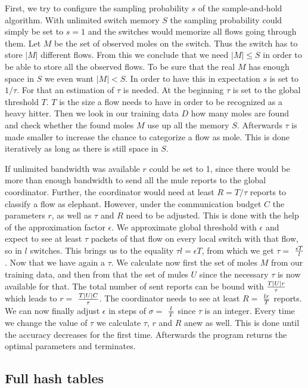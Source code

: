 \documentclass[11pt,oneside,a4paper]{article}
\begin{document}
First, we try to configure the sampling probability $s$ of the sample-and-hold algorithm. With unlimited switch memory $S$ the sampling probability could simply be set to $s=1$ and the switches would memorize all flows going through them. Let $M$ be the set of observed moles on the switch. Thus the switch has to store $|M|$ different flows. From this we conclude that we need $|M| \leq S$ in order to be able to store all the observed flows. To be sure that the real $M$ has enough space in $S$ we even want $|M| < S$. In order to have this in expectation $s$ is set to $1/\tau$. For that an estimation of $\tau$ is needed. At the beginning $\tau$ is set to the global threshold $T$. $T$ is the size a flow needs to have in order to be recognized as a heavy hitter. Then we look in our training data $D$ how many moles are found and check whether the found moles $M$ use up all the memory $S$. Afterwards $\tau$ is made smaller to increase the chance to categorize a flow as mole. This is done iteratively as long as there is still space in $S$. 

If unlimited bandwidth was available $r$ could be set to 1, since there would be more than enough bandwidth to send all the mule reports to the global coordinator. Further, the coordinator would need at least $R = T/\tau$ reports to classify a flow as elephant. However, under the communication budget $C$ the parameters $r$, as well as $\tau$ and $R$ need to be adjusted. This is done with the help of the approximation factor $\epsilon$. We approximate global threshold with $\epsilon$ and expect to see at least $\tau$ packets of that flow on every local switch with that flow, so in $l$ switches. This brings us to the equality $\tau l = \epsilon T$, from which we get $\tau =$ $\epsilon T\over l$. Now that we have again a $\tau$. We calculate now first the set of moles $M$ from our training data, and then from that the set of mules $U$ since the necessary $\tau$ is now available for that. The total number of sent reports can be bound with $T|U|r\over \tau$ which leads to $r =$ $T|U|C\over \tau$. The coordinator needs to see at least $R =$ $lr\over T$ reports. We can now finally adjust $\epsilon$ in steps of $\sigma =$ $l\over T$ since $\tau$ is an integer. Every time we change the value of $\tau$ we calculate $\tau$, $r$ and $R$ anew as well. This is done until the accuracy decreases for the first time. Afterwards the program returns the optimal parameters and terminates.

\subsection{Full hash tables} \label{special}%
\end{document}

